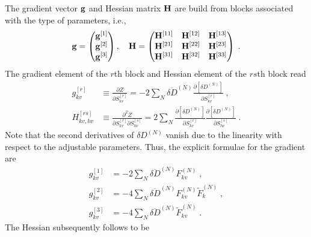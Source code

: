 \documentclass[aip,graphicx]{revtex4-1}
\begin{document}
The gradient vector ${\bf g}$ and Hessian matrix ${\bf H}$ 
are build from blocks associated with the type of parameters, i.e.,
%
\begin{equation}\label{e:Newton.gH}
 {\bf g} = 
\begin{pmatrix}
{\bf g}^{[1]} \\ 
{\bf g}^{[2]} \\ 
{\bf g}^{[3]}
\end{pmatrix} ,\quad
 {\bf H} = 
\begin{pmatrix}
{\bf H}^{[11]} & {\bf H}^{[12]} & {\bf H}^{[13]} \\ 
{\bf H}^{[21]} & {\bf H}^{[22]} & {\bf H}^{[23]} \\ 
{\bf H}^{[31]} & {\bf H}^{[32]} & {\bf H}^{[33]} 
\end{pmatrix} \;.
\end{equation}
%
The gradient element of the $r$th block and Hessian element of the $rs$th block read
%
\begin{subequations}
 \begin{align}
  g^{[r ]}_{kv}    &\equiv \frac{\partial   Z}{\partial S_{kv}^{[r]}} 
     =-2\sum_N \overline{\delta D}^{(N)}
               \frac{\partial   \left[ \delta D^{(N)} \right]}{\partial S_{kv}^{[r]}} \;,\\
  H^{[rs]}_{kv,lw} &\equiv \frac{\partial^2 Z}{\partial S_{kv}^{[r]} \partial S_{lw}^{[s]}}  
     = 2\sum_N 
        \frac{\partial   \left[ \delta D^{(N)} \right]}{\partial S_{kv}^{[r]}}
        \frac{\partial   \left[ \delta D^{(N)} \right]}{\partial S_{lw}^{[s]}} \;.
 \end{align}
\end{subequations}
%
Note that the second derivatives of $\delta D^{(N)}$ vanish
due to the linearity with respect to the adjustable parameters.
Thus, the explicit formulae for the gradient are
%
\begin{subequations}
 \begin{align}
  g^{[1]}_{kv} &=-2\sum_N \overline{\delta D}^{(N)} F^{(N)}_{kv} \;,\\
  g^{[2]}_{kv} &=-4\sum_N \overline{\delta D}^{(N)} F^{(N)}_{kv} \widetilde{F}^{(N)}_k \;,\\
  g^{[3]}_{kv} &=-4\sum_N \overline{\delta D}^{(N)} \widetilde{F}^{(N)}_{kv} \;.
 \end{align}
\end{subequations}
%
The Hessian subsequently follows to be
%
\end{document}
